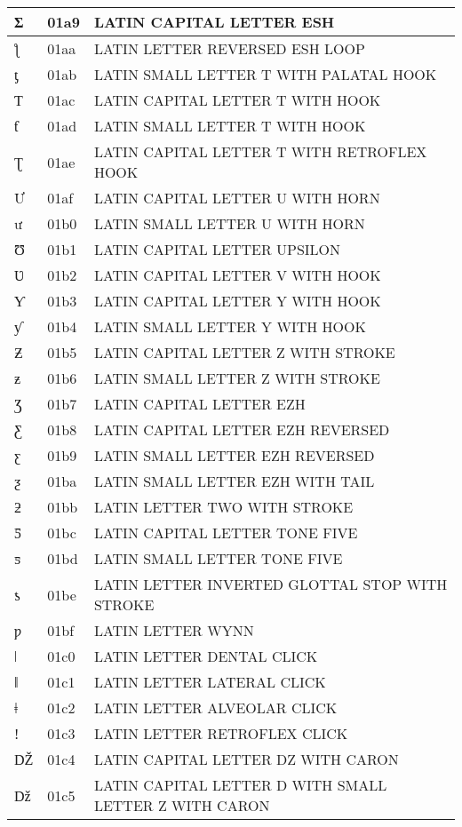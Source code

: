 \documentclass[12pt,letterpaper,openany]{book}
\begin{document}
\begin{center}
\begin{supertabular}{|m{0.25in}|m{0.5in}|m{4in}|}
Ʃ & 01a9 & LATIN CAPITAL LETTER ESH\\\hline
ƪ & 01aa & LATIN LETTER REVERSED ESH LOOP\\\hline
ƫ & 01ab & LATIN SMALL LETTER T WITH PALATAL HOOK\\\hline
Ƭ & 01ac & LATIN CAPITAL LETTER T WITH HOOK\\\hline
ƭ & 01ad & LATIN SMALL LETTER T WITH HOOK\\\hline
Ʈ & 01ae & LATIN CAPITAL LETTER T WITH RETROFLEX HOOK\\\hline
Ư & 01af & LATIN CAPITAL LETTER U WITH HORN\\\hline
ư & 01b0 & LATIN SMALL LETTER U WITH HORN\\\hline
Ʊ & 01b1 & LATIN CAPITAL LETTER UPSILON\\\hline
Ʋ & 01b2 & LATIN CAPITAL LETTER V WITH HOOK\\\hline
Ƴ & 01b3 & LATIN CAPITAL LETTER Y WITH HOOK\\\hline
ƴ & 01b4 & LATIN SMALL LETTER Y WITH HOOK\\\hline
Ƶ & 01b5 & LATIN CAPITAL LETTER Z WITH STROKE\\\hline
ƶ & 01b6 & LATIN SMALL LETTER Z WITH STROKE\\\hline
Ʒ & 01b7 & LATIN CAPITAL LETTER EZH\\\hline
Ƹ & 01b8 & LATIN CAPITAL LETTER EZH REVERSED\\\hline
ƹ & 01b9 & LATIN SMALL LETTER EZH REVERSED\\\hline
ƺ & 01ba & LATIN SMALL LETTER EZH WITH TAIL\\\hline
ƻ & 01bb & LATIN LETTER TWO WITH STROKE\\\hline
Ƽ & 01bc & LATIN CAPITAL LETTER TONE FIVE\\\hline
ƽ & 01bd & LATIN SMALL LETTER TONE FIVE\\\hline
ƾ & 01be & LATIN LETTER INVERTED GLOTTAL STOP WITH STROKE\\\hline
ƿ & 01bf & LATIN LETTER WYNN\\\hline
ǀ & 01c0 & LATIN LETTER DENTAL CLICK\\\hline
ǁ & 01c1 & LATIN LETTER LATERAL CLICK\\\hline
ǂ & 01c2 & LATIN LETTER ALVEOLAR CLICK\\\hline
ǃ & 01c3 & LATIN LETTER RETROFLEX CLICK\\\hline
Ǆ & 01c4 & LATIN CAPITAL LETTER DZ WITH CARON\\\hline
ǅ & 01c5 & LATIN CAPITAL LETTER D WITH SMALL LETTER Z WITH CARON\\\hline

\end{supertabular}
\end{center}
\end{document}
